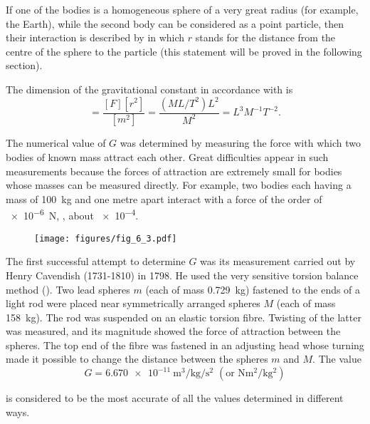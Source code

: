 If one of the bodies is a homogeneous sphere of a very great radius (for example, the Earth), while the second body can be considered as a point particle, then their interaction is described by  in which $r$ stands for the distance from the centre of the sphere to the particle (this statement will be proved in the following section).

The dimension of the gravitational constant in accordance with  is
\begin{equation*}
	[G] = \frac{[F][r^2]}{[m^2]} = \frac{(ML/T^2)L^2}{M^2} = L^3M^{-1}T^{-2}.
\end{equation*}

\noindent
The numerical value of $G$ was determined by measuring the force with which two bodies of known mass attract each other. Great difficulties appear in such measurements because the forces of attraction are extremely small for bodies whose masses can be measured directly. For example, two bodies each having a mass of \SI{100}{\kilo\gram} and one metre apart interact with a force of the order of \SI{e-6}{\newton}, \ie, about \SI{e-4}{\gf}.

\begin{figure}[t]
	\begin{center}
		\texttt{[image: figures/fig\_6\_3.pdf]}
		\caption[]{}
		\label{fig:6_3}
	\end{center}
\vspace{-0.7cm}
\end{figure}

The first successful attempt to determine $G$ was its measurement carried out by Henry Cavendish (1731-1810) in 1798. He used the very sensitive torsion balance method (). Two lead spheres $m$ (each of mass \SI{0.729}{\kilo\gram}) fastened to the ends of a light rod were placed near symmetrically arranged spheres $M$ (each of mass \SI{158}{\kilo\gram}). The rod was suspended on an elastic torsion fibre. Twisting of the latter was measured, and its magnitude showed the force of attraction between the spheres. The top end of the fibre was fastened in an adjusting head whose turning made it possible to change the distance between the spheres $m$ and $M$. The value
\begin{equation*}
	G = \SI{6.670e-11}{\metre\cubed\per\kilo\gram\per\second\squared}\,\,(\text{or}\,\, \si{\newton\metre\squared\per\kilo\gram\squared})
\end{equation*}

\noindent
is considered to be the most accurate of all the values determined in different ways.

